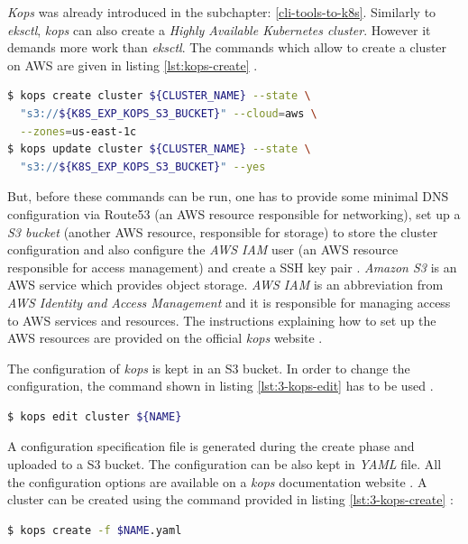 \textit{Kops} was already introduced in the subchapter: \ref{cli-tools-to-k8s}. Similarly to \textit{eksctl}, \textit{kops} can also create a \textit{Highly Available Kubernetes cluster}. However it demands more work than \textit{eksctl}. The commands which allow to create a cluster on AWS are given in listing \ref{lst:kops-create} \cite{book-mastering-k8s}.
\begin{lstlisting}[basicstyle=\scriptsize,caption={The commands of \textit{kops} CLI tool used to create a Kubernetes cluster configuration and then to deploy the cluster},captionpos=b,language=Bash,xleftmargin=1cm,label=lst:kops-create]
$ kops create cluster ${CLUSTER_NAME} --state \
  "s3://${K8S_EXP_KOPS_S3_BUCKET}" --cloud=aws \
  --zones=us-east-1c
$ kops update cluster ${CLUSTER_NAME} --state \
  "s3://${K8S_EXP_KOPS_S3_BUCKET}" --yes
\end{lstlisting}
But, before these commands can be run, one has to provide some minimal DNS configuration via Route53 (an AWS resource responsible for networking), set up a \textit{S3 bucket} (another AWS resource, responsible for storage) to store the cluster configuration \cite{book-mastering-k8s} and also configure the \textit{AWS IAM} user (an AWS resource responsible for access management) and create a SSH key pair \cite{online-kops-aws}. \textit{Amazon S3} is an AWS service which provides object storage.  \textit{AWS IAM} is an abbreviation from \textit{AWS Identity and Access Management} and it is responsible for managing access to AWS services and resources. The instructions explaining how to set up the AWS resources are provided on the official \textit{kops} website \cite{online-kops-aws}.

The configuration of \textit{kops} is kept in an S3 bucket. In order to change the configuration, the command shown in listing \ref{lst:3-kops-edit} has to be used \cite{online-kops-aws}.
\begin{lstlisting}[basicstyle=\scriptsize, label=lst:3-kops-edit,caption={A command of \textit{kops} CLI tool used to edit a Kubernetes cluster~configuration},captionpos=b,language=Bash,xleftmargin=1cm]
$ kops edit cluster ${NAME}
\end{lstlisting}

A configuration specification file is generated during the create phase and uploaded to a S3 bucket. The configuration can be also kept in \textit{YAML} file. All the configuration options are available on a \textit{kops} documentation website \cite{online-kops-yaml-config-golang}. A cluster can be created using the command provided in listing \ref{lst:3-kops-create} \cite{online-kops-yaml-config}:
\begin{lstlisting}[basicstyle=\scriptsize, label=lst:3-kops-create,caption={A command of \textit{kops} CLI tool used to create a Kubernetes cluster using a \textit{YAML} configuration file},captionpos=b,language=Bash,xleftmargin=1cm]
$ kops create -f $NAME.yaml
\end{lstlisting}


